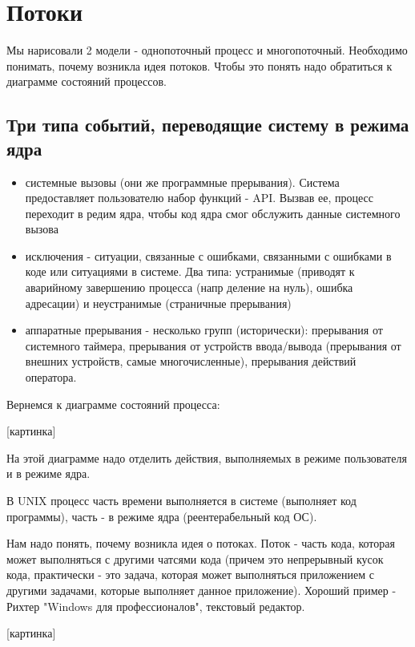 \documentclass[a4paper, 12pt]{report}
\begin{document}
	\section*{Потоки}
	
	Мы нарисовали 2 модели - однопоточный процесс и многопоточный. Необходимо понимать, почему возникла идея потоков. Чтобы это понять надо обратиться к диаграмме состояний процессов.
	
	\subsection*{Три типа событий, переводящие систему в режима ядра}
	
	\begin{itemize}
		\item системные вызовы (они же программные прерывания). Система предоставляет пользователю набор функций - API. Вызвав ее, процесс переходит в редим ядра, чтобы код ядра смог обслужить данные системного вызова
		
		\item исключения - ситуации, связанные с ошибками, связанными с ошибками в коде или ситуациями в системе. Два типа: устранимые (приводят к аварийному завершению процесса (напр деление на нуль), ошибка адресации) и неустранимые (страничные прерывания)
		
		\item аппаратные прерывания - несколько групп (исторически): прерывания от системного таймера, прерывания от устройств ввода/вывода (прерывания от внешних устройств, самые многочисленные), прерывания действий оператора.
	\end{itemize}

	Вернемся к диаграмме состояний процесса:
	
	[картинка]
	
	На этой диаграмме надо отделить действия, выполняемых в режиме пользователя и в режиме ядра.
	
	В UNIX процесс часть времени выполняется в системе (выполняет код программы), часть - в режиме ядра (реентерабельный код ОС).
	
	Нам надо понять, почему возникла идея о потоках. Поток - часть кода, которая может выполняться с другими чатсями кода (причем это непрерывный кусок кода, практически - это задача, которая может выполняться приложением с другими задачами, которые выполняет данное приложение). Хороший пример - Рихтер "Windows для профессионалов", текстовый редактор.
	
	[картинка]
	
\end{document}
